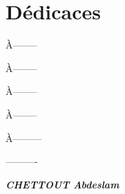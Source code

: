 \chapter*{Dédicaces}
\thispagestyle{empty}
\begin{it}

\begin{flushleft}
À-------- \newline
\newline

À--------\newline
\newline


À--------\newline
\newline

À--------\newline
\newline


À---------\newline
\newline

----------\newline
\begin{flushright}
\textbf{\textit{CHETTOUT Abdeslam}}
\end{flushright}
      

\end{flushleft}
\end{it}